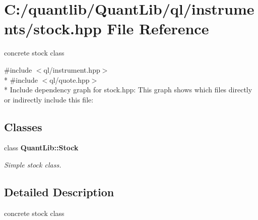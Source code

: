 \section{C\+:/quantlib/\+Quant\+Lib/ql/instruments/stock.hpp File Reference}
\label{stock_8hpp}


concrete stock class  


{\ttfamily \#include $<$ql/instrument.\+hpp$>$}\\*
{\ttfamily \#include $<$ql/quote.\+hpp$>$}\\*
Include dependency graph for stock.\+hpp\+:
This graph shows which files directly or indirectly include this file\+:
\subsection*{Classes}
\begin{DoxyCompactItemize}
\item 
class {\bf Quant\+Lib\+::\+Stock}
\begin{DoxyCompactList}\small\item\em Simple stock class. \end{DoxyCompactList}\end{DoxyCompactItemize}


\subsection{Detailed Description}
concrete stock class 

